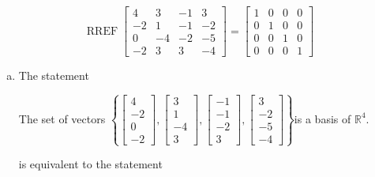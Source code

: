 \begin{exerciseAnswer} 


\[\operatorname{RREF} \left[\begin{array}{cccc}
4 & 3 & -1 & 3 \\
-2 & 1 & -1 & -2 \\
0 & -4 & -2 & -5 \\
-2 & 3 & 3 & -4
\end{array}\right] = \left[\begin{array}{cccc}
1 & 0 & 0 & 0 \\
0 & 1 & 0 & 0 \\
0 & 0 & 1 & 0 \\
0 & 0 & 0 & 1
\end{array}\right] \]


\begin{enumerate}[(a)]
\item The statement 
\begin{center}\begin{minipage}{0.8\textwidth}
 The set of vectors \( \left\{ \left[\begin{array}{c}
4 \\
-2 \\
0 \\
-2
\end{array}\right] , \left[\begin{array}{c}
3 \\
1 \\
-4 \\
3
\end{array}\right] , \left[\begin{array}{c}
-1 \\
-1 \\
-2 \\
3
\end{array}\right] , \left[\begin{array}{c}
3 \\
-2 \\
-5 \\
-4
\end{array}\right] \right\} \)is a basis of \(\mathbb{R}^4\). 
\end{minipage}\end{center}
     is equivalent to the statement 
\begin{center}\begin{minipage}{0.8\textwidth}
 The set of vectors \( \left\{ \left[\begin{array}{c}
4 \\
-2 \\

\end{array}
\end{minipage}
\end{center}
\end{enumerate}
\end{exerciseAnswer}
